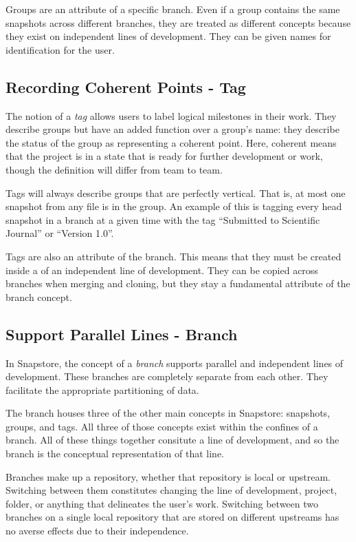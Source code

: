 Groups are an attribute of a specific branch. Even if a group contains the same snapshots across different branches, they are treated as different concepts because they exist on independent lines of development. They can be given names for identification for the user.

\subsection{Recording Coherent Points - Tag}

The notion of a \textit{tag} allows users to label logical milestones in their work. They describe groups but have an added function over a group's name: they describe the status of the group as representing a coherent point. Here, coherent means that the project is in a state that is ready for further development or work, though the definition will differ from team to team\cite{RossoJackson}. 

Tags will always describe groups that are perfectly vertical. That is, at most one snapshot from any file is in the group. An example of this is tagging every head snapshot in a branch at a given time with the tag ``Submitted to Scientific Journal'' or ``Version 1.0''.

Tags are also an attribute of the branch. This means that they must be created inside a of an independent line of development. They can be copied across branches when merging and cloning, but they stay a fundamental attribute of the branch concept.

\subsection{Support Parallel Lines - Branch}

In Snapstore, the concept of a \textit{branch} supports parallel and independent lines of development. These branches are completely separate from each other. They facilitate the appropriate partitioning of data.

The branch houses three of the other main concepts in Snapstore: snapshots, groups, and tags. All three of those concepts exist within the confines of a branch. All of these things together consitute a line of development, and so the branch is the conceptual representation of that line.

Branches make up a repository, whether that repository is local or upstream. Switching between them constitutes changing the line of development, project, folder, or anything that delineates the user's work. Switching between two branches on a single local repository that are stored on different upstreams has no averse effects due to their independence.

